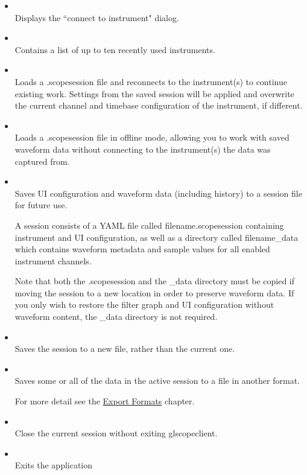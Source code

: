 \begin{itemize}
\item {}\\
Displays the ``connect to instrument" dialog.

\item {}\\
Contains a list of up to ten recently used instruments.

\item {}\\
Loads a .scopesession file and reconnects to the instrument(s) to continue existing work. Settings from the saved
session will be applied and overwrite the current channel and timebase configuration of the instrument, if different.

\item {}\\
Loads a .scopesession file in offline mode, allowing you to work with saved waveform data without connecting to the
instrument(s) the data was captured from.

\item {}\\
Saves UI configuration and waveform data (including history) to a session file for future use.

A session consists of a YAML file called filename.scopesession containing instrument and UI configuration, as well
as a directory called filename\_data which contains waveform metadata and sample values for all enabled instrument
channels.

Note that both the .scopesession and the \_data directory must be copied if moving the session to a new location in
order to preserve waveform data. If you only wish to restore the filter graph and UI configuration without waveform
content, the \_data directory is not required.

\item {}\\
Saves the session to a new file, rather than the current one.

\item {}\\

Saves some or all of the data in the active session to a file in another format.

For more detail see the \hyperref[chap:exports]{Export Formats} chapter.

\item {}\\
Close the current session without exiting glscopeclient.

\item {}\\
Exits the application

\end{itemize}


